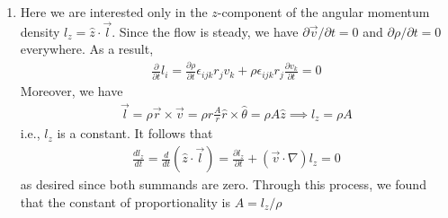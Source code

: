 \documentclass{article}
\theoremstyle{definition}
\newcommand{\p}{\partial}
\newcommand{\f}[2]{\frac{#1}{#2}}
\newcommand{\lp}{\left(}
\newcommand{\rp}{\right)}
\begin{document}
\begin{enumerate}[label=(\alph*)]
	\item Here we are interested only in the $z$-component of the angular momentum density $l_z = \hat z \cdot \vec{l}$. Since the flow is steady, we have $\p \vec{v}/\p t = 0$ and $\p \rho/\p t = 0$ everywhere. As a result,
	\begin{align*}
		\f{\p }{\p t} l_i = \f{\p \rho}{\p t} \epsilon_{ijk} r_j v_k +\rho \epsilon_{ijk} r_j \f{\p v_k}{\p t} = 0
	\end{align*}
	Moreover, we have
	\begin{align*}
	\vec{l} = \rho \vec{r} \times \vec{v} = \rho r \f{A}{r} \hat r \times \hat \theta = \rho A \hat z \implies l_z = \rho A
 	\end{align*}
	i.e., $l_z$ is a constant. It follows that 
	\begin{align*}
	\f{d l_z}{dt} = \f{d}{dt} \lp \hat z \cdot \vec{l} \rp = \f{\p l_z}{\p t} + (\vec{v}\cdot \nabla) l_z = 0  
	\end{align*}
	as desired since both summands are zero. Through this process, we found that the constant of proportionality is $\boxed{A = l_z/\rho}$  
	
	
	
	
\end{enumerate}
\end{document}

